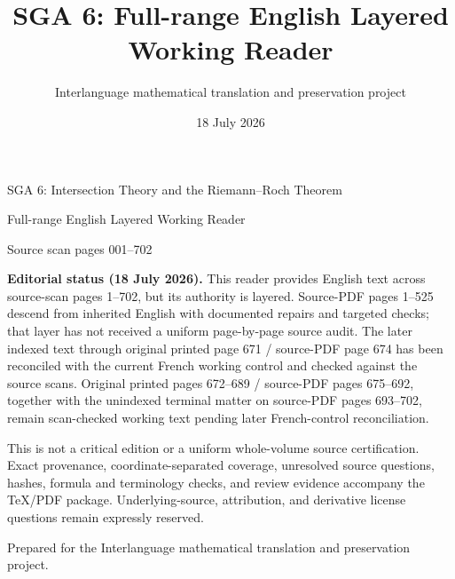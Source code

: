 \documentclass[11pt]{article}
\title{SGA 6: Full-range English Layered Working Reader}
\author{Interlanguage mathematical translation and preservation project}
\date{18 July 2026}
\begin{document}
\begin{titlepage}
\thispagestyle{empty}
\begin{center}
\vspace*{0.12\textheight}
{\LARGE SGA 6: Intersection Theory and the Riemann--Roch Theorem\par}
\vspace{1.2em}
{\Large Full-range English Layered Working Reader\par}
\vspace{2.5em}
{\large Source scan pages 001--702\par}
\vfill
\end{center}

\textbf{Editorial status (18 July 2026).}
This reader provides English text across source-scan pages 1--702, but its
authority is layered.  Source-PDF pages 1--525 descend from inherited English
with documented repairs and targeted checks; that layer has not received a
uniform page-by-page source audit.  The later indexed text through original
printed page 671 / source-PDF page 674 has been reconciled with the current
French working control and checked against the source scans.  Original
printed pages 672--689 / source-PDF pages 675--692, together with the
unindexed terminal matter on source-PDF pages 693--702, remain scan-checked
working text pending later French-control reconciliation.

This is not a critical edition or a uniform whole-volume source
certification.  Exact provenance, coordinate-separated coverage, unresolved
source questions, hashes, formula and terminology checks, and review evidence
accompany the TeX/PDF package.  Underlying-source, attribution, and derivative
license questions remain expressly reserved.
\vfill
\begin{center}
Prepared for the Interlanguage mathematical translation and preservation project.
\end{center}
\end{titlepage}



\clearpage


\end{document}
